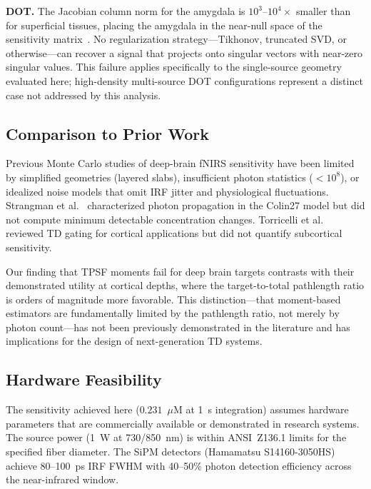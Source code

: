 \documentclass[11pt,a4paper]{article}
\begin{document}
\textbf{DOT.} The Jacobian column norm for the amygdala is $10^3$--$10^4\times$ smaller than for superficial tissues, placing the amygdala in the near-null space of the sensitivity matrix~\cite{boas2001imaging,dehghani2009depth}. No regularization strategy---Tikhonov, truncated SVD, or otherwise---can recover a signal that projects onto singular vectors with near-zero singular values. This failure applies specifically to the single-source geometry evaluated here; high-density multi-source DOT configurations represent a distinct case not addressed by this analysis.

\subsection{Comparison to Prior Work}

Previous Monte Carlo studies of deep-brain fNIRS sensitivity have been limited by simplified geometries (layered slabs), insufficient photon statistics ($<10^8$), or idealized noise models that omit IRF jitter and physiological fluctuations. Strangman et al.~\cite{strangman2014review} characterized photon propagation in the Colin27 model but did not compute minimum detectable concentration changes. Torricelli et al.~\cite{torricelli2014time} reviewed TD gating for cortical applications but did not quantify subcortical sensitivity.

Our finding that TPSF moments fail for deep brain targets contrasts with their demonstrated utility at cortical depths, where the target-to-total pathlength ratio is orders of magnitude more favorable. This distinction---that moment-based estimators are fundamentally limited by the pathlength ratio, not merely by photon count---has not been previously demonstrated in the literature and has implications for the design of next-generation TD systems.

\subsection{Hardware Feasibility}

The sensitivity achieved here ($0.231$~$\mu$M at 1~s integration) assumes hardware parameters that are commercially available or demonstrated in research systems. The source power (1~W at 730/850~nm) is within ANSI~Z136.1 limits for the specified fiber diameter. The SiPM detectors (Hamamatsu S14160-3050HS) achieve 80--100~ps IRF FWHM with 40--50\% photon detection efficiency across the near-infrared window.
\end{document}
